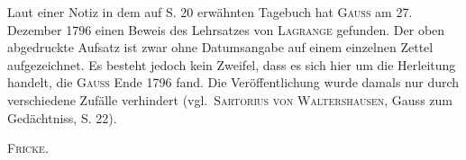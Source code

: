 \noindent\hspace*{\parindent}Laut einer Notiz in dem auf S. 20 erwähnten Tagebuch hat \textsc{Gauss} am 27. Dezember 1796 einen
Beweis des Lehrsatzes von \textsc{Lagrange} gefunden. Der oben abgedruckte Aufsatz ist
zwar ohne Datumsangabe auf einem einzelnen Zettel aufgezeichnet. Es besteht
jedoch kein Zweifel, dass es sich hier um die Herleitung handelt, die \textsc{Gauss} Ende 1796 fand.
Die Veröffentlichung wurde damals nur durch verschiedene Zufälle verhindert
(vgl.\ \textsc{Sartorius von Waltershausen}, Gauss zum Gedächtniss, S. 22).

\begin{flushright}
\textsc{Fricke}.
\end{flushright}
